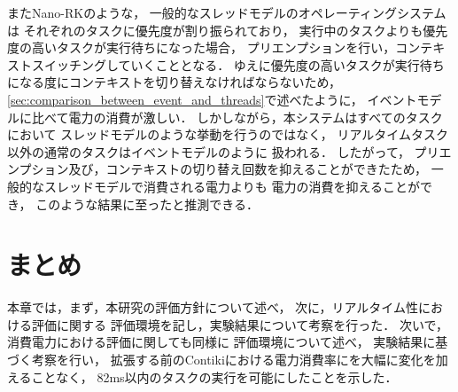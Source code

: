 またNano-RK\cite{Eswaran:2005:NER:1106608.1106672}のような，
一般的なスレッドモデルのオペレーティングシステムは
それぞれのタスクに優先度が割り振られており，
実行中のタスクよりも優先度の高いタスクが実行待ちになった場合，
プリエンプションを行い，コンテキストスイッチングしていくこととなる．
ゆえに優先度の高いタスクが実行待ちになる度にコンテキストを切り替えなければならないため，
\ref{sec:comparison_between_event_and_threads}で述べたように，
イベントモデルに比べて電力の消費が激しい．
しかしながら，本システムはすべてのタスクにおいて
スレッドモデルのような挙動を行うのではなく，
リアルタイムタスク以外の通常のタスクはイベントモデルのように
扱われる．
したがって，
プリエンプション及び，コンテキストの切り替え回数を抑えることができたため，
一般的なスレッドモデルで消費される電力よりも
電力の消費を抑えることができ，
このような結果に至ったと推測できる．





\section{まとめ}
本章では，まず，本研究の評価方針について述べ，
次に，リアルタイム性における評価に関する
評価環境を記し，実験結果について考察を行った．
次いで，消費電力における評価に関しても同様に
評価環境について述べ，
実験結果に基づく考察を行い，
拡張する前のContikiにおける電力消費率にを大幅に変化を加えることなく，
82ms以内のタスクの実行を可能にしたことを示した．



